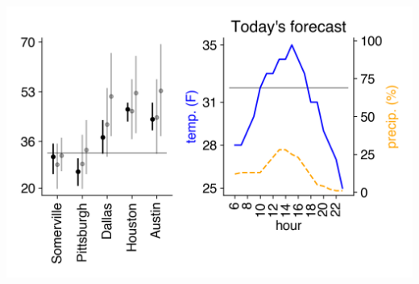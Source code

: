\documentclass[landscape]{article}
\date{\today}
\begin{document}
\maketitle

\begin{multicols}{3}
\vspace{-0.3cm}\includegraphics[width=\linewidth]{images/weather.png}

{}
\vspace{-0.3cm}


\noindent

\vspace{-0.3cm}

\begin{center}
	
\end{center}


\end{multicols}
\end{document}
